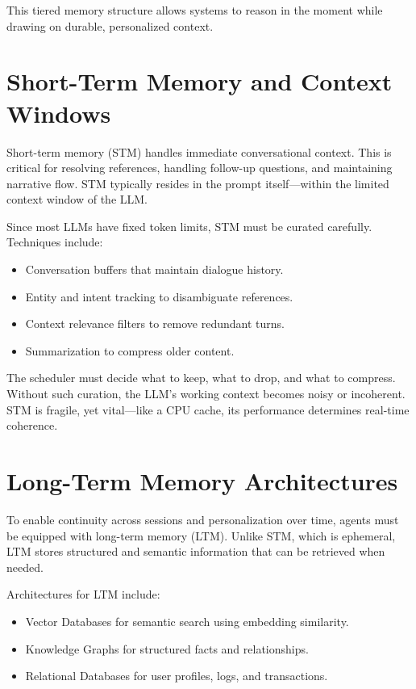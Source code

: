 \documentclass{book}
\begin{document}
This tiered memory structure allows systems to reason in the moment while drawing on durable, personalized context.

\section{Short-Term Memory and Context Windows}

Short-term memory (STM) handles immediate conversational context. This is critical for resolving references, handling follow-up questions, and maintaining narrative flow. STM typically resides in the prompt itself—within the limited context window of the LLM.

Since most LLMs have fixed token limits, STM must be curated carefully. Techniques include:

\begin{itemize}
  \item Conversation buffers that maintain dialogue history.
  \item Entity and intent tracking to disambiguate references.
  \item Context relevance filters to remove redundant turns.
  \item Summarization to compress older content.
\end{itemize}

The scheduler must decide what to keep, what to drop, and what to compress. Without such curation, the LLM’s working context becomes noisy or incoherent. STM is fragile, yet vital—like a CPU cache, its performance determines real-time coherence.

\section{Long-Term Memory Architectures}

To enable continuity across sessions and personalization over time, agents must be equipped with long-term memory (LTM). Unlike STM, which is ephemeral, LTM stores structured and semantic information that can be retrieved when needed.

Architectures for LTM include:

\begin{itemize}
  \item Vector Databases for semantic search using embedding similarity.
  \item Knowledge Graphs for structured facts and relationships.
  \item Relational Databases for user profiles, logs, and transactions.
\end{itemize}
\end{document}
